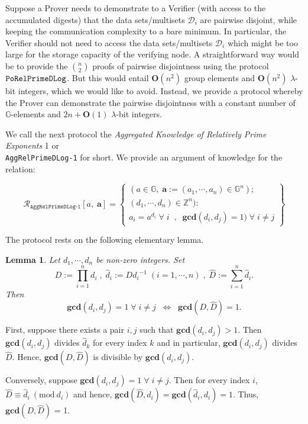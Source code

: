 \documentclass[11pt, lettersize, notitlepage, leqno, footskip=0.6cm]{article}
\newcommand{\bz}{\mathbb Z}
\newcommand{\pl}{\prod\limits}
\newcommand{\slim}{\sum\limits}
\newcommand{\ttt}{\texttt}
\newcommand{\LRA}{\Longleftrightarrow}
\newcommand{\mc}{\mathcal}
\newcommand{\mb}{\mathbb}
\newcommand{\mbf}{\mathbf}
\newcommand{\lam}{\lambda}
\newcommand{\what}{\widehat}
\newcommand{\bO}{\mbf{O}}
\newcommand{\vs}{\vspace{-0.15cm}}
\newcommand{\noin}{\noindent}
\newcommand{\Mod}[1]{\ (\mathrm{mod}\ #1)}
\newcommand{\GCD}{\mbf{gcd}}
\newtheorem{Lem}[Thm]{Lemma}
\numberwithin{equation}{section}
\begin{document}
Suppose a Prover needs to demonstrate to a Verifier (with access to the accumulated digests) that the data sets/multisets $\mc{D}_i$ are pairwise disjoint, while keeping the communication complexity to a bare minimum. In particular, the Verifier should not need to access the data sets/multisets $\mc{D}_i$ which might be too large for the storage capacity of the verifying node. A straightforward way would be to provide the $n\choose 2$ proofs of pairwise disjointness using the protocol $\tt{PoRelPrimeDLog}$. But this would entail $\mbf{O}(n^2)$ group elements and $\mbf{O}(n^2)$ $\lam$-bit integers, which we would like to avoid. Instead, we provide a protocol whereby the Prover can demonstrate the pairwise disjointness with a constant number of $\mb{G}$-elements and $2n+\bO(1)$ $\lam$-bit integers.

We call the next protocol the \textit{Aggregated Knowledge of Relatively Prime Exponents} 1 or\\ \verb|AggRelPrimeDLog-1| for short. We provide an argument of knowledge for the relation:

\[
  \mc{R}_{\ttt{AggRelPrimeDLog-1}}[a,\; \mbf{a}] = \left\{\begin{array}{l}
    (a\in\mb{G},\;  \mbf{a}:=(a_1,\cdots, a_n)\in\mb{G}^n);\\
    (d_1,\cdots,d_n)\in\bz^n): \\
    a_i = a^{d_i}\;\forall\;i\;\;,\;\; \GCD(d_i, d_j) = 1)\;\forall \;i\neq j   	
  \end{array}\right\}
\] 

\noin The protocol rests on the following elementary lemma.

\begin{Lem}\label{lcm} Let $d_1,\cdots,d_n$ be non-zero integers. Set \vs $$D:= \pl_{i=1}^n d_i\;,\; \what{d}_i:= {D}{d_i}^{-1}\;(i=1,\cdots,n) \;,\;\what{D}:= \slim_{i=1}^n \what{d}_i.$$ Then \vs $$\GCD(d_i,d_j)=1\;\forall\;i\neq j\;\; \LRA \;\; \GCD(D, \what{D}) = 1 .$$\end{Lem}

\begin{prf} First, suppose there exists a pair $i,j$ such that $\GCD(d_i,d_j)> 1$. Then $\GCD(d_i,d_j)$ divides $\what{d}_k$ for every index $k$ and in particular, $\GCD(d_i,d_j)$ divides $\what{D}$. Hence, $\GCD(D,\what{D})$ is divisible by $\GCD(d_i,d_j)$.

Conversely, suppose $\GCD(d_i,d_j)=1\;\forall\;i\neq j$. Then for every index $i$, $\what{D}\equiv \what{d}_i\Mod{d_i} $ and hence, $\GCD(\what{D}, d_i) = \GCD(\what{d}_i, d_i) = 1$. Thus, $\GCD(D,\what{D})$ = 1.\end{prf}
\end{document}

